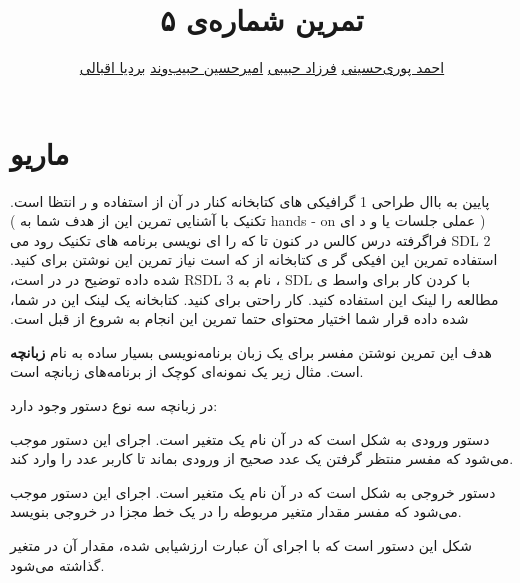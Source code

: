 \documentclass{utap}
\title{تمرین شماره‌ی ۵}
\author{
	\href{mailto:seyedahmadpourihosseini@gmail.com?subject=[AP\%20S98\%20A5]\%20}{احمد پوری‌حسینی}
	\href{mailto:farzadhabibii98@gmail.com?subject=[AP\%20S98\%20A5]\%20}{فرزاد حبیبی}
	\href{mailto:ahhabibvand@gmail.com?subject=[AP\%20S98\%20A5]\%20}{امیرحسین حبیب‌وند}
	\href{mailto:bardia.eghbali@gmail.com??subject=[AP\%20S98\%20A5]\%20}{بردیا اقبالی}
}
\begin{document}
    \maketitle
	
    \section{ ماریو }
    
    

	‫ر‬ ‫انتظا‬ ‫است‪.‬‬ ‫گرافیکی‬ ‫های‬ ‫کتابخانه‬ ‫کنار‬ ‫در‬ ‫آن‬ ‫از‬ ‫استفاده‬ ‫و‬ ‫‪1‬‬ ‫پایین‬ ‫به‬ ‫باال‬ ‫طراحی‬ ‫تکنیک‬ ‫با‬ ‫آشنایی‬ ‫تمرین‬ ‫این‬ ‫از‬ ‫هدف‬
	‫شما‬ ‫به‬ ‫)‬ ‫‪hands‬‬ ‫‪-‬‬ ‫‪on‬‬ ‫(‬ ‫عملی‬ ‫جلسات‬ ‫یا‬ ‫و‬ ‫د‬ ‫ای‬ ‫فراگرفته‬ ‫درس‬ ‫کالس‬ ‫در‬ ‫کنون‬ ‫تا‬ ‫که‬ ‫را‬ ‫ای‬ ‫نویسی‬ ‫برنامه‬ ‫های‬ ‫تکنیک‬ ‫رود‬ ‫می‬
	‫‪SDL‬‬ ‫‪2‬‬ ‫افیکی‬ ‫گر‬ ‫ی‬ ‫کتابخانه‬ ‫از‬ ‫که‬ ‫است‬ ‫نیاز‬ ‫تمرین‬ ‫این‬ ‫نوشتن‬ ‫برای‬ ‫کنید‪.‬‬ ‫استفاده‬ ‫تمرین‬ ‫این‬ ‫در‬ ‫است‪،‬‬ ‫شده‬ ‫داده‬ ‫توضیح‬
	‫در‬ ‫‪RSDL‬‬ ‫‪3‬‬ ‫نام‬ ‫به‬ ‫‪،‬‬ ‫‪SDL‬‬ ‫با‬ ‫کردن‬ ‫کار‬ ‫برای‬ ‫واسط‬ ‫ی‬ ‫کتابخانه‬ ‫یک‬ ‫لینک‬ ‫این‬ ‫در‬ ‫شما‪،‬‬ ‫کار‬ ‫راحتی‬ ‫برای‬ ‫کنید‪.‬‬ ‫استفاده‬
	‫کنید‪.‬‬ ‫مطالعه‬ ‫را‬ ‫لینک‬ ‫این‬ ‫محتوای‬ ‫حتما‬ ‫تمرین‬ ‫این‬ ‫انجام‬ ‫به‬ ‫شروع‬ ‫از‬ ‫قبل‬ ‫است‪.‬‬ ‫شده‬ ‫داده‬ ‫قرار‬ ‫شما‬ ‫اختیار‬
	
	

    هدف این تمرین نوشتن مفسر برای یک زبان برنامه‌نویسی بسیار ساده به نام \textbf{زبانچه} است. مثال زیر یک نمونه‌ای کوچک از برنامه‌های زبانچه است.

    \begin{latin}
    
    \end{latin}

    در زبانچه سه نوع دستور وجود دارد:

    \begin{description}[leftmargin=6em,style=nextline,font=\labelitemi\quad\bfseries]
    \item[ورودی]
    دستور ورودی به شکل  است که در آن  نام یک متغیر است. اجرای این دستور موجب می‌شود که مفسر منتظر گرفتن یک عدد صحیح از ورودی بماند تا کاربر عدد را وارد کند.
    \item[خروجی]
    دستور خروجی به شکل  است که در آن  نام یک متغیر است. اجرای این دستور موجب می‌شود که مفسر مقدار متغیر مربوطه را در یک خط مجزا در خروجی بنویسد.
    \item[جایگزینی]
    شکل این دستور  است که با اجرای آن عبارت  ارزشیابی شده، مقدار آن در متغیر  گذاشته می‌شود.
    \end{description}
\end{document}
